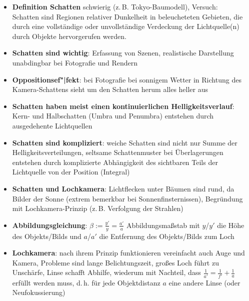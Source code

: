 \begin{itemize}
    \item
    \textbf{Definition Schatten} schwierig (z.\,B. Tokyo-Baumodell),
    Versuch: \\
    Schatten sind Regionen relativer Dunkelheit in beleucheteten Gebieten,
    die durch eine vollständige oder unvollständige Verdeckung der
    Lichtquelle(n) durch Objekte hervorgerufen werden.
    
    \item
    \textbf{Schatten sind wichtig}: Erfassung von Szenen, realistische
    Darstellung unabdingbar bei Fotografie und Rendern
    
    \item
    \textbf{Oppositionsef"|fekt}:
    bei Fotografie bei sonnigem Wetter in Richtung des Kamera-Schat\-tens
    sieht um den Schatten herum alles heller aus
    
    \item
    \textbf{Schatten haben meist einen kontinuierlichen Helligkeitsverlauf}:
    Kern- und Halbschatten (Umbra und Penumbra)
    entstehen durch ausgedehente Lichtquellen
    
    \item
    \textbf{Schatten sind kompliziert}:
    weiche Schatten sind nicht nur Summe der Helligkeitsverteilungen,
    seltsame Schattenmuster bei Überlagerungen entstehen durch komplizierte
    Abhängigkeit des sichtbaren Teils der Lichtquelle von der Position
    (Integral)
    
    \item
    \textbf{Schatten und Lochkamera}:
    Lichtflecken unter Bäumen sind rund, da Bilder der Sonne
    (extrem bemerkbar bei Sonnenfinsternissen), Begründung mit
    Lochkamera-Prinzip (z.\,B. Verfolgung der Strahlen)
    
    \item
    \textbf{Abbildungsgleichung}: $\beta := \frac{y'}{y} = \frac{a'}{a}$
    Abbildungsmaßstab mit
    $y$/$y'$ die Höhe des Objekts/Bilds und
    $a$/$a'$ die Entfernung des Objekts/Bilds zum Loch
    
    \item
    \textbf{Lochkamera}:
    nach ihrem Prinzip funktionieren vereinfacht auch Auge und Kamera,
    Probleme sind lange Belichtungszeit, großes Loch führt zu Unschärfe,
    Linse schafft Abhilfe, wiederum mit Nachteil, dass
    $\frac{1}{a'} = \frac{1}{f'} + \frac{1}{a}$ erfüllt werden muss, d.\,h.
    für jede Objektdistanz $a$ eine andere Linse (oder Neufokussierung)
\end{itemize}
